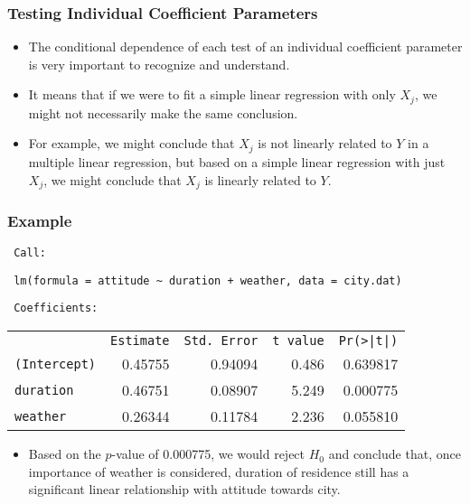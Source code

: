 \documentclass[14pt]{beamer}
\begin{document}
\begin{frame}
	\frametitle{Testing Individual Coefficient Parameters}
	
	\begin{itemize}[label={\color{blue}$\blacktriangleright$}]
		\item The conditional dependence of each test of an individual coefficient parameter is very important to recognize and understand.
		
		\item It means that if we were to fit a simple linear regression with only $X_j$, we might not necessarily make the same conclusion.
		
		\item For example, we might conclude that $X_j$ is not linearly related to $Y$ in a multiple linear regression, but based on a simple linear regression with just $X_j$, we might conclude that $X_j$ is linearly related to $Y$.
	\end{itemize}
	
\end{frame}
\begin{frame}
	\frametitle{Example}
	
	{\footnotesize
		{\tt\ Call:}
	\vspace{0.2cm}
	
	{\tt\ lm(formula = attitude \textasciitilde{} duration + weather, data = city.dat)}
	
	\vspace{2mm}
	{\tt\ Coefficients:}
	\begin{center}
		\begin{tabular}{lrrrr}
			& {\tt Estimate} & {\tt Std. Error} & {\tt t value} & {\tt Pr(>|t|)} \\
			{\tt (Intercept)} & 0.45755 & 0.94094 & 0.486 & 0.639817 \\
			{\color{red}\tt duration} & {\color{red}0.46751} & {\color{red}0.08907} & {\color{red}5.249} & {\color{red}0.000775} \\
			{\tt weather} & 0.26344 & 0.11784 & 2.236 & 0.055810 \\
		\end{tabular}
	\end{center}
	\vspace{0.2cm}}
	
	\begin{itemize}[label={\color{blue}$\blacktriangleright$}]
		\item Based on the $p$-value of 0.000775, we would reject $H_0$ and conclude that, once importance of weather is considered, duration of residence still has a significant linear relationship with attitude towards city.
	\end{itemize}
	
\end{frame}
\end{document}
